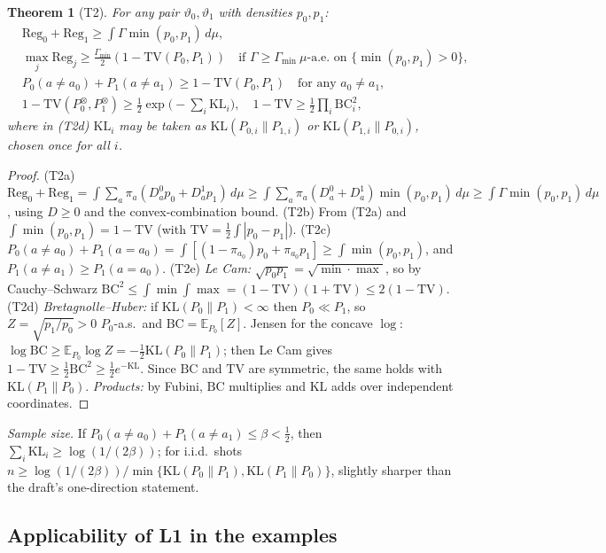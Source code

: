 \documentclass[11pt,a4paper]{article}
\newtheorem{theorem}{Theorem}
\theoremstyle{definition}
\theoremstyle{remark}
\newcommand{\E}{\mathbb{E}}
\newcommand{\vt}{\vartheta}
\newcommand{\TV}{\mathrm{TV}}
\newcommand{\KL}{\mathrm{KL}}
\newcommand{\BC}{\mathrm{BC}}
\begin{document}
\begin{theorem}[T2]\label{thm:T2}
For any pair $\vt_0,\vt_1$ with densities $p_0,p_1$:
\begin{align*}
&\mathrm{Reg}_0+\mathrm{Reg}_1\ge\textstyle\int\Gamma\min(p_0,p_1)\,d\mu, \tag{T2a}\\
&\max_j\mathrm{Reg}_j\ge\tfrac{\Gamma_{\min}}2(1-\TV(P_0,P_1))\quad
\text{if }\Gamma\ge\Gamma_{\min}\ \mu\text{-a.e.\ on }\{\min(p_0,p_1)>0\}, \tag{T2b}\\
&P_0(a\neq a_0)+P_1(a\neq a_1)\ge1-\TV(P_0,P_1)\quad\text{for any }a_0\neq a_1, \tag{T2c}\\
&1-\TV(P_0^{\otimes},P_1^{\otimes})\ge\tfrac12\exp\!\bigl(-\textstyle\sum_i\KL_i\bigr),\quad
1-\TV\ge\tfrac12\prod_i\BC_i^2, \tag{T2d--e}
\end{align*}
where in (T2d) $\KL_i$ may be taken as $\KL(P_{0,i}\|P_{1,i})$ or
$\KL(P_{1,i}\|P_{0,i})$, chosen once for all $i$.
\end{theorem}
\begin{proof}
(T2a) $\mathrm{Reg}_0+\mathrm{Reg}_1=\int\sum_a\pi_a(D^0_ap_0+D^1_ap_1)\,d\mu
\ge\int\sum_a\pi_a(D^0_a+D^1_a)\min(p_0,p_1)\,d\mu\ge\int\Gamma\min(p_0,p_1)\,d\mu$,
using $D\ge0$ and the convex-combination bound.
(T2b) From (T2a) and $\int\min(p_0,p_1)=1-\TV$ (with $\TV=\frac12\int|p_0-p_1|$).
(T2c) $P_0(a\neq a_0)+P_1(a=a_0)=\int[(1-\pi_{a_0})p_0+\pi_{a_0}p_1]\ge\int\min(p_0,p_1)$,
and $P_1(a\neq a_1)\ge P_1(a=a_0)$.
(T2e) \emph{Le Cam:} $\sqrt{p_0p_1}=\sqrt{\min\cdot\max}$, so by Cauchy--Schwarz
$\BC^2\le\int\min\int\max=(1-\TV)(1+\TV)\le2(1-\TV)$.
(T2d) \emph{Bretagnolle--Huber:} if $\KL(P_0\|P_1)<\infty$ then $P_0\ll P_1$, so
$Z=\sqrt{p_1/p_0}>0$ $P_0$-a.s.\ and $\BC=\E_{P_0}[Z]$. Jensen for the concave $\log$:
$\log\BC\ge\E_{P_0}\log Z=-\tfrac12\KL(P_0\|P_1)$; then Le Cam gives
$1-\TV\ge\tfrac12\BC^2\ge\tfrac12e^{-\KL}$. Since $\BC$ and $\TV$ are symmetric, the same
holds with $\KL(P_1\|P_0)$. \emph{Products:} by Fubini, $\BC$ multiplies and $\KL$ adds
over independent coordinates.
\end{proof}
\noindent\emph{Sample size.} If $P_0(a\neq a_0)+P_1(a\neq a_1)\le\beta<\tfrac12$, then
$\sum_i\KL_i\ge\log(1/(2\beta))$; for i.i.d.\ shots
$n\ge\log(1/(2\beta))/\min\{\KL(P_0\|P_1),\KL(P_1\|P_0)\}$, slightly sharper than the
draft's one-direction statement.

\subsection{Applicability of L1 in the examples}
\end{document}
